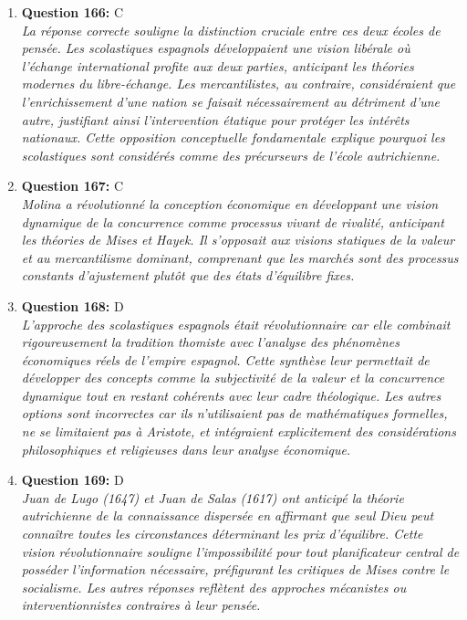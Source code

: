 \documentclass[12pt,a4paper]{article}
\begin{document}
\begin{enumerate}
\item \textbf{Question 166:} C
\\ \textit{La réponse correcte souligne la distinction cruciale entre ces deux écoles de pensée. Les scolastiques espagnols développaient une vision libérale où l'échange international profite aux deux parties, anticipant les théories modernes du libre-échange. Les mercantilistes, au contraire, considéraient que l'enrichissement d'une nation se faisait nécessairement au détriment d'une autre, justifiant ainsi l'intervention étatique pour protéger les intérêts nationaux. Cette opposition conceptuelle fondamentale explique pourquoi les scolastiques sont considérés comme des précurseurs de l'école autrichienne.}

\item \textbf{Question 167:} C
\\ \textit{Molina a révolutionné la conception économique en développant une vision dynamique de la concurrence comme processus vivant de rivalité, anticipant les théories de Mises et Hayek. Il s'opposait aux visions statiques de la valeur et au mercantilisme dominant, comprenant que les marchés sont des processus constants d'ajustement plutôt que des états d'équilibre fixes.}

\item \textbf{Question 168:} D
\\ \textit{L'approche des scolastiques espagnols était révolutionnaire car elle combinait rigoureusement la tradition thomiste avec l'analyse des phénomènes économiques réels de l'empire espagnol. Cette synthèse leur permettait de développer des concepts comme la subjectivité de la valeur et la concurrence dynamique tout en restant cohérents avec leur cadre théologique. Les autres options sont incorrectes car ils n'utilisaient pas de mathématiques formelles, ne se limitaient pas à Aristote, et intégraient explicitement des considérations philosophiques et religieuses dans leur analyse économique.}

\item \textbf{Question 169:} D
\\ \textit{Juan de Lugo (1647) et Juan de Salas (1617) ont anticipé la théorie autrichienne de la connaissance dispersée en affirmant que seul Dieu peut connaître toutes les circonstances déterminant les prix d'équilibre. Cette vision révolutionnaire souligne l'impossibilité pour tout planificateur central de posséder l'information nécessaire, préfigurant les critiques de Mises contre le socialisme. Les autres réponses reflètent des approches mécanistes ou interventionnistes contraires à leur pensée.}


\end{enumerate}
\end{document}
